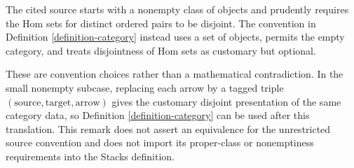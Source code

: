 \begin{remark}
\label{remark-tohoku-category-conventions}
\begin{reference}
\cite[Chapter I, \S 1.1, pp. 122--123]{Tohoku}
\end{reference}
\begin{history}
The cited source starts with a nonempty class of objects and prudently
requires the Hom sets for distinct ordered pairs to be disjoint.  The
convention in Definition \ref{definition-category} instead uses a set of
objects, permits the empty category, and treats disjointness of Hom sets as
customary but optional.
\end{history}
These are convention choices rather than a mathematical contradiction.  In
the small nonempty subcase, replacing each arrow by a tagged triple
\((\text{source},\text{target},\text{arrow})\) gives the customary disjoint
presentation of the same category data, so Definition
\ref{definition-category} can be used after this translation.  This remark
does not assert an equivalence for the unrestricted source convention and
does not import its proper-class or nonemptiness requirements into the
Stacks definition.
\end{remark}
